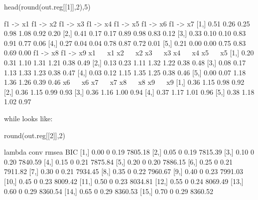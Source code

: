 \documentclass[article]{jss}
\begin{document}
\begin{CodeChunk}
\begin{CodeInput}
head(round(out.reg[[1]],2),5)
\end{CodeInput}
\begin{CodeOutput}
     f1 -> x1 f1 -> x2 f1 -> x3 f1 -> x4 f1 -> x5 f1 -> x6 f1 -> x7
[1,]     0.51     0.26     0.25     0.98     1.08     0.92     0.20
[2,]     0.41     0.17     0.17     0.89     0.98     0.83     0.12
[3,]     0.33     0.10     0.10     0.83     0.91     0.77     0.06
[4,]     0.27     0.04     0.04     0.78     0.87     0.72     0.01
[5,]     0.21     0.00     0.00     0.75     0.83     0.69     0.00
     f1 -> x8 f1 -> x9 x1 ~~ x1 x2 ~~ x2 x3 ~~ x3 x4 ~~ x4 x5 ~~ x5
[1,]     0.20     0.31     1.10     1.31     1.21     0.38     0.49
[2,]     0.13     0.23     1.11     1.32     1.22     0.38     0.48
[3,]     0.08     0.17     1.13     1.33     1.23     0.38     0.47
[4,]     0.03     0.12     1.15     1.35     1.25     0.38     0.46
[5,]     0.00     0.07     1.18     1.36     1.26     0.39     0.46
     x6 ~~ x6 x7 ~~ x7 x8 ~~ x8 x9 ~~ x9
[1,]     0.36     1.15     0.98     0.92
[2,]     0.36     1.15     0.99     0.93
[3,]     0.36     1.16     1.00     0.94
[4,]     0.37     1.17     1.01     0.96
[5,]     0.38     1.18     1.02     0.97
\end{CodeOutput}
\end{CodeChunk}

\noindent
while  looks like:

\begin{CodeChunk}
\begin{CodeInput}
round(out.reg[[2]],2)
\end{CodeInput}
\begin{CodeOutput}
      lambda conv rmsea     BIC
 [1,]   0.00    0  0.19 7805.18
 [2,]   0.05    0  0.19 7815.39
 [3,]   0.10    0  0.20 7840.59
 [4,]   0.15    0  0.21 7875.84
 [5,]   0.20    0  0.20 7886.15
 [6,]   0.25    0  0.21 7911.82
 [7,]   0.30    0  0.21 7934.45
 [8,]   0.35    0  0.22 7960.67
 [9,]   0.40    0  0.23 7991.03
[10,]   0.45    0  0.23 8009.42
[11,]   0.50    0  0.23 8034.81
[12,]   0.55    0  0.24 8069.49
[13,]   0.60    0  0.29 8360.54
[14,]   0.65    0  0.29 8360.53
[15,]   0.70    0  0.29 8360.52
\end{CodeOutput}
\end{CodeChunk}
\end{document}
